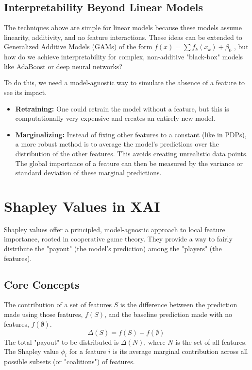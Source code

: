 \documentclass{article}
\begin{document}
\begin{multicols}{2}
	\subsection{Interpretability Beyond Linear Models}
	The techniques above are simple for linear models because these models assume linearity, additivity, and no feature interactions. These ideas can be extended to Generalized Additive Models (GAMs) of the form $f(x) = \sum f_k(x_k) + \beta_0$ , but how do we achieve interpretability for complex, non-additive "black-box" models like AdaBoost or deep neural networks?

	To do this, we need a model-agnostic way to simulate the absence of a feature to see its impact.
	\begin{itemize}
		\item \textbf{Retraining:} One could retrain the model without a feature, but this is computationally very expensive and creates an entirely new model.
		\item \textbf{Marginalizing:} Instead of fixing other features to a constant (like in PDPs), a more robust method is to average the model's predictions over the distribution of the other features. This avoids creating unrealistic data points. The global importance of a feature can then be measured by the variance or standard deviation of these marginal predictions.
	\end{itemize}

	\section{Shapley Values in XAI}
	Shapley values offer a principled, model-agnostic approach to local feature importance, rooted in cooperative game theory. They provide a way to fairly distribute the "payout" (the model's prediction) among the "players" (the features).

	\subsection{Core Concepts}
	The contribution of a set of features $S$ is the difference between the prediction made using those features, $f(S)$, and the baseline prediction made with no features, $f(\emptyset)$.
	$$ \Delta(S) = f(S) - f(\emptyset) $$
	The total "payout" to be distributed is $\Delta(N)$, where $N$ is the set of all features. The Shapley value $\phi_i$ for a feature $i$ is its average marginal contribution across all possible subsets (or "coalitions") of features.


\end{multicols}
\end{document}
